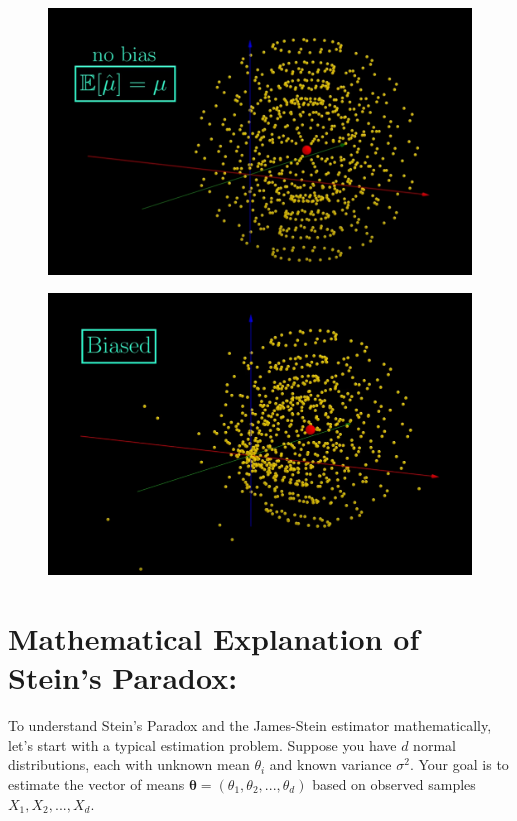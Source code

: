 \documentclass{article}
\begin{document}
\begin{figure}
    \centering
    \includegraphics[width=1\linewidth]{overviews/james-stein-estimator/figures/unbiased.png}
    \caption{}
    \label{fig:enter-label}
\end{figure}
\begin{figure}
    \centering
    \includegraphics[width=1\linewidth]{overviews/james-stein-estimator/figures/biased.png}
    \caption{}
    \label{fig:enter-label}
\end{figure}

\section*{Mathematical Explanation of Stein's Paradox:}

To understand Stein's Paradox and the James-Stein estimator mathematically, let's start with a typical estimation problem. Suppose you have \(d\) normal distributions, each with unknown mean \(\theta_i\) and known variance \(\sigma^2\). Your goal is to estimate the vector of means \(\boldsymbol{\theta} = (\theta_1, \theta_2, ..., \theta_d)\) based on observed samples \(X_1, X_2, ..., X_d\).
\end{document}
